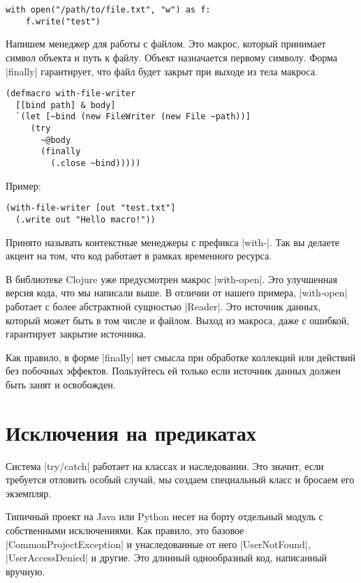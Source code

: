 \begin{verbatim}
with open("/path/to/file.txt", "w") as f:
    f.write("test")
\end{verbatim}
Напишем менеджер для работы с файлом. Это макрос, который принимает символ
объекта и путь к файлу. Объект назначается первому символу. Форма
\spverb|finally| гарантирует, что файл будет закрыт при выходе из тела макроса.

\begin{verbatim}
(defmacro with-file-writer
  [[bind path] & body]
  `(let [~bind (new FileWriter (new File ~path))]
     (try
       ~@body
       (finally
         (.close ~bind)))))
\end{verbatim}

Пример:

\begin{verbatim}
(with-file-writer [out "test.txt"]
  (.write out "Hello macro!"))
\end{verbatim}

Принято называть контекстные менеджеры с префикса \spverb|with-|. Так вы делаете акцент
на том, что код работает в рамках временного ресурса.

В библиотеке Clojure уже предусмотрен макрос \spverb|with-open|. Это улучшенная версия
кода, что мы написали выше. В отличии от нашего примера, \spverb|with-open| работает с
более абстрактной сущностью \spverb|Reader|. Это источник данных, который может быть в
том числе и файлом. Выход из макроса, даже с ошибкой, гарантирует закрытие
источника.

Как правило, в форме \spverb|finally| нет смысла при обработке коллекций или действий
без побочных эффектов. Пользуйтесь ей только если источник данных должен быть
занят и освобожден.

\section{Исключения на предикатах}

Система \spverb|try/catch| работает на классах и наследовании. Это значит, если
требуется отловить особый случай, мы создаем специальный класс и бросаем его
экземпляр.

Типичный проект на Java или Python несет на борту отдельный модуль с
собственными исключениями. Как правило, это базовое \spverb|CommonProjectException| и
унаследованные от него \spverb|UserNotFound|, \spverb|UserAccessDenied| и другие. Это длинный
однообразный код, написанный вручную.

